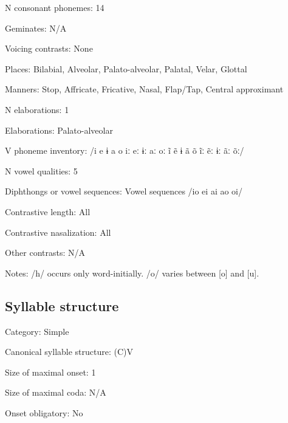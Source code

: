 {\begin{appendixdesc}
\item[N consonant phonemes:] 14

\item[Geminates:] N/A

\item[Voicing contrasts:] None

\item[Places:] Bilabial, Alveolar, Palato-alveolar, Palatal, Velar, Glottal

\item[Manners:] Stop, Affricate, Fricative, Nasal, Flap/Tap, Central approximant

\item[N elaborations:] 1

\item[Elaborations:] Palato-alveolar

\item[V phoneme inventory:] /i e ɨ a o iː eː ɨː aː oː ĩ ẽ ɨ ã õ ĩː ẽː ɨː ãː õː/

\item[N vowel qualities:] 5

\item[Diphthongs or vowel sequences:] Vowel sequences /io ei ai ao oi/

\item[Contrastive length:] All

\item[Contrastive nasalization:] All

\item[Other contrasts:] N/A

\item[Notes:] /h/ occurs only word-initially. /o/ varies between [o] and [u]. 
\end{appendixdesc}
\subsection*{Syllable structure}
\begin{appendixdesc}

\item[Category:] Simple

\item[Canonical syllable structure:] (C)V \citep[87--90]{Facundes2000}

\item[Size of maximal onset:] 1

\item[Size of maximal coda:] N/A

\item[Onset obligatory:] No


\end{appendixdesc}}
